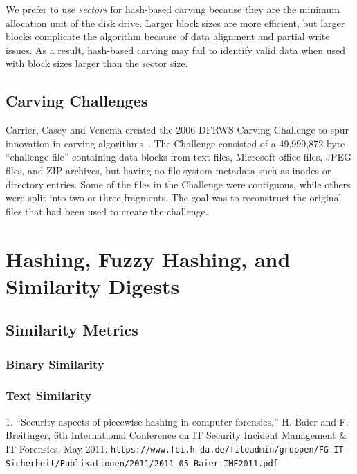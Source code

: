 \documentclass[11pt,letter]{article}
\begin{document}
We prefer to use \emph{sectors} for hash-based
carving because they are the minimum allocation unit of the disk
drive. Larger block sizes are more efficient, but larger blocks
complicate the algorithm because of data alignment and partial write
issues. As a result, hash-based carving may fail to identify valid
data when used with block sizes larger than the sector size.


\section{Carving Challenges}

Carrier, Casey and Venema created the 2006 DFRWS Carving Challenge
to spur innovation in carving
algorithms~\cite{dfrws2006-challenge}. The Challenge consisted of a
49,999,872 byte ``challenge file'' containing data blocks from text
files, Microsoft office files, JPEG files, and ZIP 
archives, but having no file system metadata such as inodes or
directory entries. Some of the files in the Challenge were
contiguous, while others were split into two or three fragments. The
goal was to reconstruct the original files
that had been used to create the challenge. 




\chapter{Hashing, Fuzzy Hashing, and Similarity Digests}

\section{Similarity Metrics}
\subsection{Binary Similarity}
\cite{dfrws2011:VassilRoussev}
\subsection{Text Similarity}
\cite{dfrws2011:ClayShieldsAndOphirFriederAndMarkMaloof}


1. “Security aspects of piecewise hashing in computer forensics,”
H. Baier and F. Breitinger, 6th International Conference on IT
Security Incident Management \& IT Forensics, May 2011. 
\verb+https://www.fbi.h-da.de/fileadmin/gruppen/FG-IT-Sicherheit/Publikationen/2011/2011_05_Baier_IMF2011.pdf+
\end{document}
